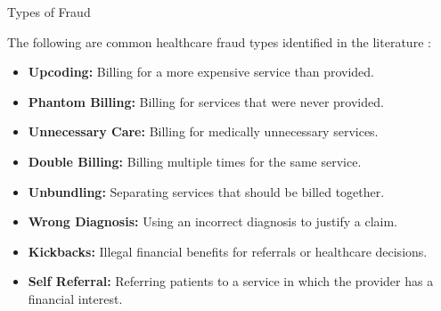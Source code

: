 \documentclass[aspectratio=169,11pt]{beamer}
\begin{document}
\begin{frame}{Types of Fraud}

\small
The following are common healthcare fraud types identified in the
literature \cite{ref5}:

\begin{itemize}
    \item \textbf{Upcoding:} Billing for a more expensive service than provided.
    
    \item \textbf{Phantom Billing:} Billing for services that were never provided.
    
    \item \textbf{Unnecessary Care:} Billing for medically unnecessary services.
    
    \item \textbf{Double Billing:} Billing multiple times for the same service.
    
    \item \textbf{Unbundling:} Separating services that should be billed together.
    
    \item \textbf{Wrong Diagnosis:} Using an incorrect diagnosis to justify a claim.
    
    \item \textbf{Kickbacks:} Illegal financial benefits for referrals or healthcare decisions.
    
    \item \textbf{Self Referral:} Referring patients to a service in which the provider has a financial interest.
\end{itemize}

\end{frame}
\end{document}
